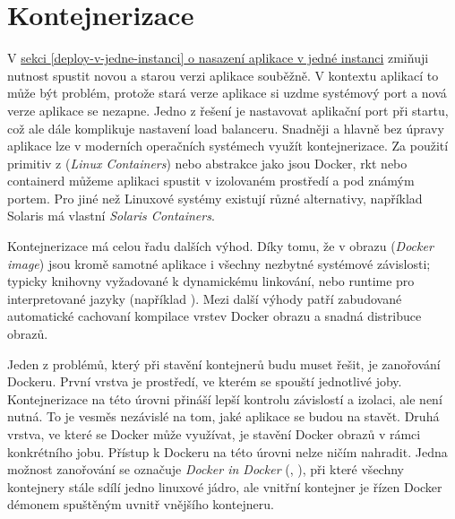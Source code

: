     \section*{Kontejnerizace}
        V \hyperref[deploy-v-jedne-instanci]{sekci \ref*{deploy-v-jedne-instanci} o nasazení aplikace v jedné instanci} zmiňuji nutnost spustit novou a starou verzi aplikace souběžně. V kontextu \HTTP aplikací to může být problém, protože stará verze aplikace si uzdme systémový port a nová verze aplikace se nezapne. Jedno z řešení je nastavovat aplikační port při startu, což ale dále komplikuje nastavení load balanceru. Snadněji a hlavně bez úpravy aplikace lze v moderních operačních systémech využít kontejnerizace. Za použití primitiv z  (\textit{Linux Containers}) nebo abstrakce jako jsou Docker, rkt nebo containerd můžeme aplikaci spustit v izolovaném prostředí a pod známým portem. Pro jiné než Linuxové systémy existují různé alternativy, například Solaris má vlastní \textit{Solaris Containers}.

        Kontejnerizace má celou řadu dalších výhod. Díky tomu, že v obrazu (\textit{Docker image}) jsou kromě samotné aplikace i všechny nezbytné systémové závislosti; typicky knihovny vyžadované k dynamickému linkování, nebo runtime pro interpretované jazyky (například ). Mezi další výhody patří zabudované automatické cachovaní kompilace vrstev Docker obrazu a snadná distribuce obrazů.

        \label{sec:dind}
        Jeden z problémů, který při stavění kontejnerů budu muset řešit, je zanořování Dockeru. První vrstva je prostředí, ve kterém se spouští jednotlivé \CI joby. Kontejnerizace na této úrovni přináší lepší kontrolu závislostí a izolaci, ale není nutná. To je vesměs nezávislé na tom, jaké aplikace se budou na \CI stavět. Druhá vrstva, ve které se Docker může využívat, je stavění Docker obrazů v rámci konkrétního \CI jobu. Přístup k Dockeru na této úrovni nelze ničím nahradit. Jedna možnost zanořování se označuje \textit{Docker in Docker} (, ), při které všechny kontejnery stále sdílí jedno linuxové jádro, ale vnitřní kontejner je řízen Docker démonem spuštěným uvnitř vnějšího kontejneru.

